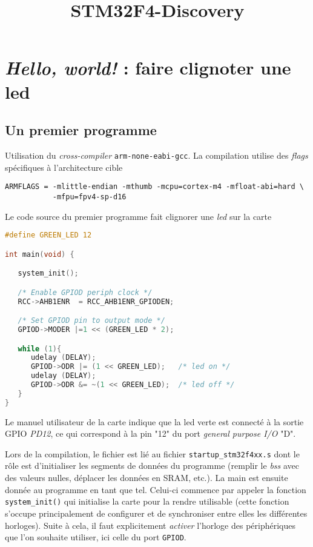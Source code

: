 \documentclass[12pt]{article}
\title{STM32F4-Discovery}
\date{\now}
\begin{document}

\section{\emph{Hello, world!} : faire clignoter une led}

\subsection{Un premier programme}
Utilisation du \emph{cross-compiler} \texttt{arm-none-eabi-gcc}.
La compilation utilise des \emph{flags} spécifiques à l'architecture cible 

\begin{lstlisting} 
ARMFLAGS = -mlittle-endian -mthumb -mcpu=cortex-m4 -mfloat-abi=hard \
           -mfpu=fpv4-sp-d16 
\end{lstlisting}

Le code source du premier programme fait clignorer une \emph{led} sur la carte

\begin{lstlisting}[language=C]
#define GREEN_LED 12

int main(void) {

   system_init();

   /* Enable GPIOD periph clock */
   RCC->AHB1ENR  = RCC_AHB1ENR_GPIODEN;

   /* Set GPIOD pin to output mode */
   GPIOD->MODER |=1 << (GREEN_LED * 2);

   while (1){
      udelay (DELAY);
      GPIOD->ODR |= (1 << GREEN_LED);   /* led on */
      udelay (DELAY);
      GPIOD->ODR &= ~(1 << GREEN_LED);  /* led off */
   }
}

\end{lstlisting}

Le manuel utilisateur \cite{user:manual} de la carte indique que la led verte est connecté à la sortie GPIO \emph{PD12}, ce qui correspond à la pin "12" du port \emph{general purpose I/O} "D".

Lors de la compilation, le fichier est lié au fichier \texttt{startup\_stm32f4xx.s} dont le rôle est d'initialiser les segments de données du programme (remplir le \emph{bss} avec des valeurs nulles, déplacer les données en SRAM, etc.). La main est ensuite donnée au programme en tant que tel. Celui-ci commence par appeler la fonction \texttt{system\_init()} qui initialise la carte pour la rendre utilisable (cette fonction s'occupe principalement de configurer et de synchroniser entre elles les différentes horloges). Suite à cela, il faut explicitement \emph{activer} l'horloge des périphériques que l'on souhaite utiliser, ici celle du port \texttt{GPIOD}. 
\end{document}
